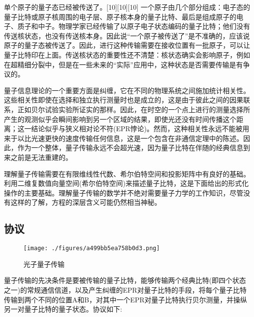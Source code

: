 单个原子的量子态已经被传送了。[10][10][10] 一个原子由几个部分组成：电子态的量子比特或原子核周围的电子层、原子核本身的量子比特、最后是组成原子的电子、质子和中子。物理学家已经传输了以原子电子状态编码的量子比特；他们没有传送核状态，也没有传送核本身。因此说“一个原子被传送了”是不准确的，应该说原子的量子态被传送了。因此，进行这种传输需要在接收位置有一批原子，可以让量子比特印在上面。传送核状态的重要性还不清楚：核状态确实会影响原子，例如在超精细分裂中，但是在一些未来的“实际”应用中，这种状态是否需要传输是有争议的。



量子信息理论的一个重要方面是纠缠，它在不同的物理系统之间施加统计相关性。这些相关性即使在选择和独立执行测量时也是成立的，这是由于彼此之间的因果联系，正如贝尔试验实验所证实的那样。因此，在时空的一个点上进行的测量选择所产生的观测似乎会瞬间影响到另一个区域的结果，即使光还没有时间传播这个距离；这一结论似乎与狭义相对论不符(EPR悖论)。然而，这种相关性永远不能被用来于以比光速更快的速度传输任何信息，这是一个包含在非通信定理中的陈述。因此，作为一个整体，量子传输永远不会超光速，因为量子比特在伴随的经典信息到来之前是无法重建的。

理解量子传输需要在有限维线性代数、希尔伯特空间和投影矩阵中有良好的基础。利用二维复数值向量空间(希尔伯特空间)来描述量子比特，这是下面给出的形式化操作的主要基础。理解量子传输的数学并不绝对需要量子力学的工作知识，尽管没有这样的了解，方程的深层含义可能仍然相当神秘。

\subsection{协议}

\begin{figure}[ht]
\centering
\texttt{[image: ./figures/a499bb5ea758b0d3.png]}
\caption{光子量子传输} \label{fig_LZYXCT_3}
\end{figure}

量子传输的先决条件是要被传输的量子比特，能够传输两个经典比特(即四个状态之一)的常规通信信道，以及产生纠缠的EPR对量子比特的手段，将每个量子比特传输到两个不同的位置A和B，对其中一个EPR对量子比特执行贝尔测量，并操纵另一对量子比特的量子状态。协议如下:

